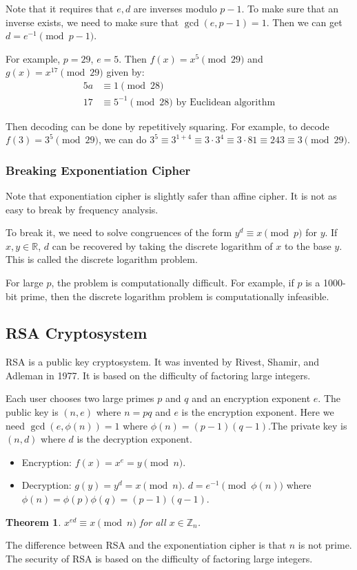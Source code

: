 \documentclass[letterpaper,12pt,oneside]{article}
\newtheorem{theorem}{Theorem}
\begin{document}
Note that it requires that $e,d$ are inverses modulo $p-1$. To make sure that an inverse exists, we need to make sure that $\gcd(e,p-1)=1$. Then we can get $d= e ^{-1} \pmod {p-1}$.

For example, $p=29$, $e=5$. Then $f(x)=x^5 \pmod {29}$ and $g(x)=x^{17} \pmod {29}$ given by: \begin{align*}
    5a &\equiv 1 \pmod {28}\\
    17 &\equiv 5^{-1} \pmod {28} \text{ by Euclidean algorithm}
\end{align*}

Then decoding can be done by repetitively squaring. For example, to decode $f(3)=3^5 \pmod {29}$, we can do $3^5\equiv 3^{1+4} \equiv 3\cdot 3^4 \equiv 3\cdot 81 \equiv 243 \equiv 3 \pmod {29}$.
\subsubsection{Breaking Exponentiation Cipher}
Note that exponentiation cipher is slightly safer than affine cipher. It is not as easy to break by frequency analysis.

To break it, we need to solve congruences of the form $y^d \equiv x \pmod p$ for $y$. If $x,y \in \mathbb{R}$, $d$ can be recovered by taking the discrete logarithm of $x$ to the base $y$. This is called the discrete logarithm problem.

For large $p$, the problem is computationally difficult. For example, if $p$ is a 1000-bit prime, then the discrete logarithm problem is computationally infeasible.
\subsection{RSA Cryptosystem}
RSA is a public key cryptosystem. It was invented by Rivest, Shamir, and Adleman in 1977. It is based on the difficulty of factoring large integers.

Each user chooses two large primes $p$ and $q$ and an encryption exponent $e$. The public key is $(n,e)$ where $n=pq$ and $e$ is the encryption exponent. Here we need $\gcd(e,\phi(n)) = 1$ where $\phi(n)=(p-1)(q-1)$.The private key is $(n,d)$ where $d$ is the decryption exponent.
\begin{itemize}
    \item Encryption: $f(x)=x^e=y \pmod n$.
    \item Decryption: $g(y)=y^d=x \pmod n$. $d = e^{-1} \pmod {\phi(n)}$ where $\phi(n)=\phi(p)\phi(q)=(p-1)(q-1)$. 
\end{itemize}
\begin{theorem}
    $x^{ed}\equiv x \pmod n$ for all $x\in \mathbb{Z}_n$.
\end{theorem}
The difference between RSA and the exponentiation cipher is that $n$ is not prime. The security of RSA is based on the difficulty of factoring large integers.
\end{document}
